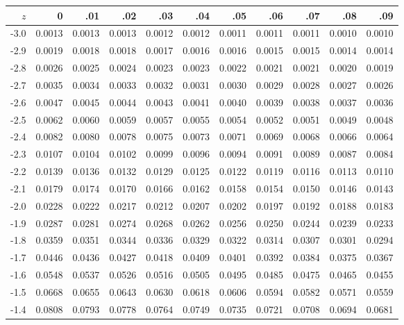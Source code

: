 \begin{table}[ht]
    \centering
    \begin{tabular}{rrrrrrrrrrr}
      \hline
    \(z\) & 0 & .01 & .02 & .03 & .04 & .05 & .06 & .07 & .08 & .09 \\
      \hline
    -3.0 & 0.0013 & 0.0013 & 0.0013 & 0.0012 & 0.0012 & 0.0011 & 0.0011 & 0.0011 & 0.0010 & 0.0010 \\ 
      -2.9 & 0.0019 & 0.0018 & 0.0018 & 0.0017 & 0.0016 & 0.0016 & 0.0015 & 0.0015 & 0.0014 & 0.0014 \\
      -2.8 & 0.0026 & 0.0025 & 0.0024 & 0.0023 & 0.0023 & 0.0022 & 0.0021 & 0.0021 & 0.0020 & 0.0019 \\
      -2.7 & 0.0035 & 0.0034 & 0.0033 & 0.0032 & 0.0031 & 0.0030 & 0.0029 & 0.0028 & 0.0027 & 0.0026 \\
      -2.6 & 0.0047 & 0.0045 & 0.0044 & 0.0043 & 0.0041 & 0.0040 & 0.0039 & 0.0038 & 0.0037 & 0.0036 \\
      -2.5 & 0.0062 & 0.0060 & 0.0059 & 0.0057 & 0.0055 & 0.0054 & 0.0052 & 0.0051 & 0.0049 & 0.0048 \\
      -2.4 & 0.0082 & 0.0080 & 0.0078 & 0.0075 & 0.0073 & 0.0071 & 0.0069 & 0.0068 & 0.0066 & 0.0064 \\
      -2.3 & 0.0107 & 0.0104 & 0.0102 & 0.0099 & 0.0096 & 0.0094 & 0.0091 & 0.0089 & 0.0087 & 0.0084 \\
      -2.2 & 0.0139 & 0.0136 & 0.0132 & 0.0129 & 0.0125 & 0.0122 & 0.0119 & 0.0116 & 0.0113 & 0.0110 \\
      -2.1 & 0.0179 & 0.0174 & 0.0170 & 0.0166 & 0.0162 & 0.0158 & 0.0154 & 0.0150 & 0.0146 & 0.0143 \\
      -2.0 & 0.0228 & 0.0222 & 0.0217 & 0.0212 & 0.0207 & 0.0202 & 0.0197 & 0.0192 & 0.0188 & 0.0183 \\
      -1.9 & 0.0287 & 0.0281 & 0.0274 & 0.0268 & 0.0262 & 0.0256 & 0.0250 & 0.0244 & 0.0239 & 0.0233 \\
      -1.8 & 0.0359 & 0.0351 & 0.0344 & 0.0336 & 0.0329 & 0.0322 & 0.0314 & 0.0307 & 0.0301 & 0.0294 \\
      -1.7 & 0.0446 & 0.0436 & 0.0427 & 0.0418 & 0.0409 & 0.0401 & 0.0392 & 0.0384 & 0.0375 & 0.0367 \\
      -1.6 & 0.0548 & 0.0537 & 0.0526 & 0.0516 & 0.0505 & 0.0495 & 0.0485 & 0.0475 & 0.0465 & 0.0455 \\
      -1.5 & 0.0668 & 0.0655 & 0.0643 & 0.0630 & 0.0618 & 0.0606 & 0.0594 & 0.0582 & 0.0571 & 0.0559 \\
      -1.4 & 0.0808 & 0.0793 & 0.0778 & 0.0764 & 0.0749 & 0.0735 & 0.0721 & 0.0708 & 0.0694 & 0.0681 \\

\end{tabular}
\end{table}

